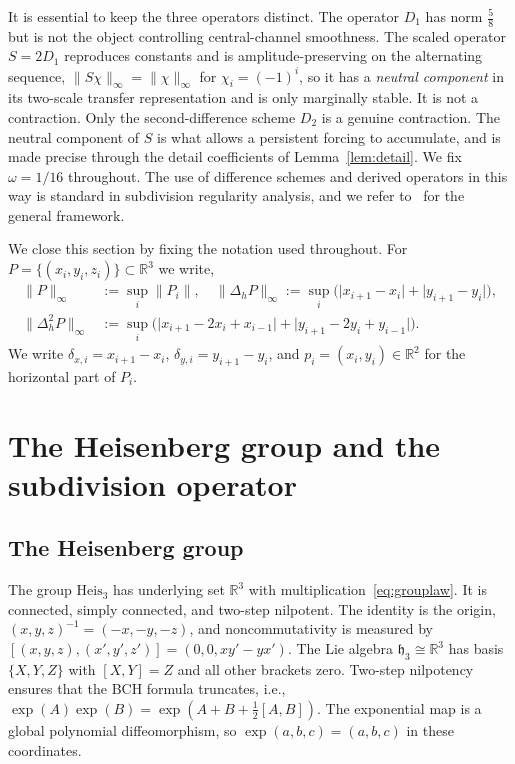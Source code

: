 \documentclass{article}
\theoremstyle{plain}
\theoremstyle{definition}
\newcommand{\R}{\mathbb{R}}
\newcommand{\Heis}{\mathrm{Heis}_3}
\newcommand{\heis}{\mathfrak{h}_3}
\newcommand{\norm}[1]{\lVert #1 \rVert}
\newcommand{\abs}[1]{\lvert #1 \rvert}
\newcommand{\Dh}{\Delta_h}
\newcommand{\Dhh}{\Delta_h^2}
\begin{document}
It is essential to keep the three operators distinct. The operator $D_1$ has norm $\tfrac58$
but is not the object controlling central-channel smoothness. The scaled
operator $S=2D_1$ reproduces constants and is amplitude-preserving on the
alternating sequence, $\norm{S\chi}_\infty=\norm{\chi}_\infty$ for
$\chi_i=(-1)^i$, so it has a \emph{neutral component} in its two-scale transfer
representation and is only marginally stable. It is not a contraction. Only
the second-difference scheme $D_2$ is a genuine contraction. The neutral
component of $S$ is what allows a persistent forcing to accumulate, and is made
precise through the detail coefficients of Lemma~\ref{lem:detail}. We fix
$\omega=1/16$ throughout. The use of difference schemes and derived operators in
this way is standard in subdivision regularity analysis, and we refer
to~\cite{Dyn92, DynLevin02, Zorin00} for the general framework.

We close this section by fixing the notation used throughout. For
$P=\{(x_i,y_i,z_i)\}\subset\R^3$ we write,
\begin{align*}
  \norm{P}_\infty &:= \sup_i\norm{P_i},\quad
  \norm{\Dh P}_\infty := \sup_i\bigl(\abs{x_{i+1}-x_i}+\abs{y_{i+1}-y_i}\bigr),\\
  \norm{\Dhh P}_\infty &:= \sup_i\bigl(\abs{x_{i+1}-2x_i+x_{i-1}}
    +\abs{y_{i+1}-2y_i+y_{i-1}}\bigr).
\end{align*}
We write $\delta_{x,i}=x_{i+1}-x_i$, $\delta_{y,i}=y_{i+1}-y_i$, and
$p_i=(x_i,y_i)\in\R^2$ for the horizontal part of $P_i$.

\section{The Heisenberg group and the subdivision operator}\label{sec:construction}

\subsection{The Heisenberg group}

The group $\Heis$ has underlying set $\R^3$ with multiplication~\eqref{eq:grouplaw}.
It is connected, simply connected, and two-step nilpotent. The identity is
the origin, $(x,y,z)^{-1}=(-x,-y,-z)$, and noncommutativity is measured by
$[(x,y,z),(x',y',z')] = (0,0,xy'-yx')$. The Lie algebra $\heis\cong\R^3$
has basis $\{X,Y,Z\}$ with $[X,Y]=Z$ and all other brackets zero.
Two-step nilpotency ensures that the BCH formula
truncates, i.e., $\exp(A)\exp(B)=\exp(A+B+\tfrac{1}{2}[A,B])$. The exponential
map is a global polynomial diffeomorphism, so $\exp(a,b,c)=(a,b,c)$ in these
coordinates.
\end{document}
